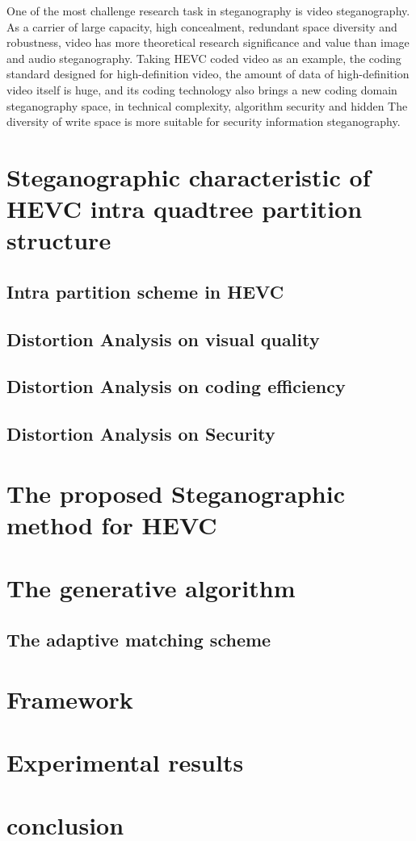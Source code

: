 \documentclass[journal,sort]{IEEEtran}
\begin{document}
One of the most challenge research task in steganography is video steganography. As a carrier of large capacity, high concealment, redundant space diversity and robustness, video has more theoretical research significance and value than image and audio steganography. Taking HEVC coded video as an example, the coding standard designed for high-definition video, the amount of data of high-definition video itself is huge, and its coding technology also brings a new coding domain steganography space, in technical complexity, algorithm security and hidden The diversity of write space is more suitable for security information steganography.


\section{Steganographic characteristic of HEVC intra quadtree partition structure}

\subsection{Intra partition scheme in HEVC}
\subsection{Distortion Analysis on visual quality}

\subsection{Distortion Analysis on coding efficiency}
\subsection{Distortion Analysis on Security}
\section{The proposed Steganographic method for HEVC}

\section{The generative algorithm}

\subsection{The adaptive matching scheme}
\section{Framework}



\section{Experimental results}
\section{conclusion}




	
	
	
	
	
	
	
\end{document}
